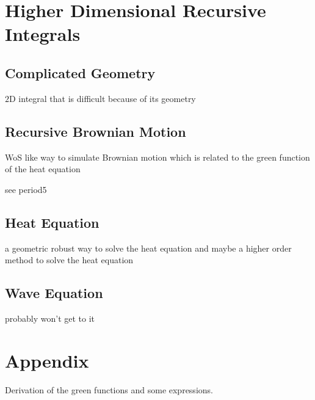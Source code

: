 \documentclass[a4paper,12pt]{article}
\begin{document}
\section{Higher Dimensional Recursive Integrals}
\subsection{Complicated Geometry}
\begin{example}
    $2$D integral that is difficult because of its geometry
\end{example}

\subsection{Recursive Brownian Motion}
WoS like way to simulate Brownian motion which is related to the green function
of the heat equation

\begin{example}
    see period5
\end{example}

\subsection{Heat Equation}
a geometric robust way to solve the heat equation and maybe a higher order method to solve
the heat equation

\subsection{Wave Equation}
probably won't get to it

\newpage
\printbibliography
\newpage

\section{Appendix}
Derivation of the green functions and some expressions.
\end{document}
